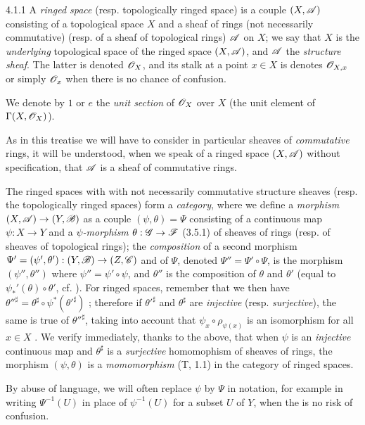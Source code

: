 \begin{env}{4.1.1}
\label{env-0.4.1.1}
A \emph{ringed space} (resp. topologically ringed space) is a couple $(X,\mathscr{A})$
consisting of a topological space $X$ and a sheaf of rings (not necessarily commutative)
(resp. of a sheaf of topological rings) $\mathscr{A}$ on $X$; we say that $X$ is the
\emph{underlying} topological space of the ringed space $(X,\mathscr{A})$, and $\mathscr{A}$
the \emph{structure sheaf}. The latter is denoted $\mathscr{O}_X$, and its stalk at a point
$x\in X$ is denotes $\mathscr{O}_{X,x}$ or simply $\mathscr{O}_x$ when there is no chance of confusion.

We denote by $1$ or $e$ the \emph{unit section} of $\mathscr{O}_X$ over $X$ (the unit element
of $\Gamma(X,\mathscr{O}_X)$).

As in this treatise we will have to consider in particular sheaves of \emph{commutative}
rings, it will be understood, when we speak of a ringed space $(X,\mathscr{A})$ without
specification, that $\mathscr{A}$ is a sheaf of commutative rings.

The ringed spaces with with not necessarily commutative structure sheaves
(resp. the topologically ringed spaces) form a \emph{category}, where we define
a \emph{morphism} $(X,\mathscr{A})\to(Y,\mathscr{B})$ as a couple $(\psi,\theta)=\Psi$
consisting of a continuous map $\psi:X\to Y$ and a \emph{$\psi$-morphism}
$\theta:\mathscr{G}\to\mathscr{F}$ (3.5.1) of sheaves of rings (resp. of sheaves of
topological rings); the \emph{composition} of a second morphism
$\Psi'=(\psi',\theta'):(Y,\mathscr{B})\to(Z,\mathscr{C})$ and of $\Psi$, denoted
$\Psi''=\Psi'\circ\Psi$, is the morphism $(\psi'',\theta'')$ where $\psi''=\psi'\circ\psi$,
and $\theta''$ is the composition of $\theta$ and $\theta'$ (equal to
$\psi_*'(\theta)\circ\theta'$, cf. ). For ringed spaces, remember that we
then have ${\theta''}^\sharp=\theta^\sharp\circ\psi^*({\theta'}^\sharp)$ ;
therefore if ${\theta'}^\sharp$ and $\theta^\sharp$ are \emph{injective} (resp.
\emph{surjective}), the same is true of ${\theta''}^\sharp$, taking into account that
$\psi_x\circ\rho_{\psi(x)}$ is an isomorphism for all $x\in X$ . We verify
immediately, thanks to the above, that when $\psi$ is an \emph{injective} continuous map and
$\theta^\sharp$ is a \emph{surjective} homomophism of sheaves of rings, the morphism
$(\psi,\theta)$ is a \emph{momomorphism} (T, 1.1) in the category of ringed spaces.

By abuse of language, we will often replace $\psi$ by $\Psi$ in notation, for
example in writing $\Psi^{-1}(U)$ in place of $\psi^{-1}(U)$ for a subset $U$ of $Y$,
when the is no risk of confusion.
\end{env}

